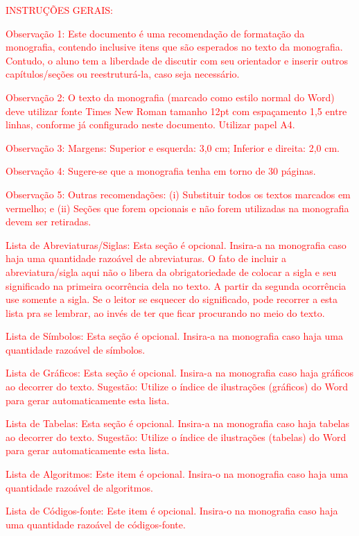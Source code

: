 \textcolor{red}{INSTRUÇÕES GERAIS:}

\textcolor{red}{Observação 1: Este documento é uma recomendação de formatação da monografia, contendo inclusive itens que são esperados no texto da monografia. Contudo, o aluno tem a liberdade de discutir com seu orientador e inserir outros capítulos/seções ou reestruturá-la, caso seja necessário.}

\textcolor{red}{Observação 2: O texto da monografia (marcado como estilo normal do Word)  deve utilizar fonte Times New Roman tamanho 12pt com espaçamento 1,5 entre linhas, conforme já configurado neste documento. Utilizar papel A4.}

\textcolor{red}{Observação 3: Margens: Superior e esquerda: 3,0 cm; Inferior e direita: 2,0 cm.}

\textcolor{red}{Observação 4: Sugere-se que a monografia tenha em torno de 30  páginas.}

\textcolor{red}{Observação 5: Outras recomendações: (i) Substituir todos os textos marcados em vermelho; e (ii) Seções que forem opcionais e não forem utilizadas na monografia devem ser retiradas.}

\textcolor{red}{Lista de Abreviaturas/Siglas: Esta seção é opcional. Insira-a na monografia caso haja uma quantidade razoável de abreviaturas. O fato de incluir a abreviatura/sigla aqui não o libera da obrigatoriedade de colocar a sigla e seu significado na primeira ocorrência dela no texto. A partir da segunda ocorrência use somente a sigla. Se o leitor se esquecer do significado, pode recorrer a esta lista pra se lembrar, ao invés de ter que ficar procurando no meio do texto.}

\textcolor{red}{Lista de Símbolos: Esta seção é opcional. Insira-a na monografia caso haja uma quantidade razoável de símbolos.}

\textcolor{red}{Lista de Gráficos: Esta seção é opcional. Insira-a na monografia caso haja gráficos ao decorrer do texto.
Sugestão: Utilize o índice de ilustrações (gráficos) do Word para gerar automaticamente esta lista.}

\textcolor{red}{Lista de Tabelas: Esta seção é opcional. Insira-a na monografia caso haja tabelas ao decorrer do texto.
Sugestão: Utilize o índice de ilustrações (tabelas) do Word para gerar automaticamente esta lista.}

\textcolor{red}{Lista de Algoritmos: Este item é opcional. Insira-o na monografia caso haja uma quantidade razoável de algoritmos.}

\textcolor{red}{Lista de Códigos-fonte: Este item é opcional. Insira-o na monografia caso haja uma quantidade razoável de códigos-fonte.}

